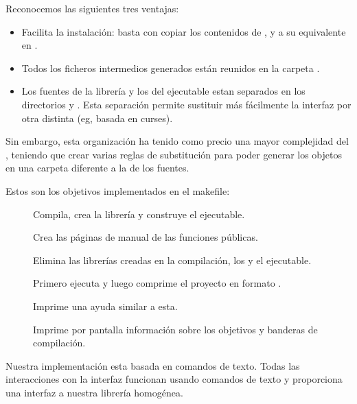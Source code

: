\documentclass[12pt, a4paper]{memoriaeps}
\begin{document}
Reconocemos las siguientes tres ventajas:
\begin{itemize}
	\item Facilita la instalación: basta con copiar los contenidos de ,  y  a su equivalente en .
	\item Todos los ficheros intermedios generados están reunidos en la carpeta .
	\item Los fuentes de la librería y los del ejecutable estan separados en los directorios  y . Esta separación permite sustituir más fácilmente la interfaz por otra distinta (eg, basada en curses).
\end{itemize}

Sin embargo, esta organización ha tenido como precio una mayor complejidad del , teniendo que crear varias reglas de substitución para poder generar los objetos en una carpeta diferente a la de los fuentes.

Estos son los objetivos implementados en el makefile:
\begin{description}
	\item[]   Compila, crea la librería y construye el ejecutable.
	\item[]  Crea las páginas de manual de las funciones públicas.
	\item[] Elimina las librerías creadas en la compilación, los  y el ejecutable.
	\item[]  Primero ejecuta  y luego comprime el proyecto en formato .
	\item[]  Imprime una ayuda similar a esta.
	\item[]  Imprime por pantalla información sobre los objetivos y banderas de compilación.
\end{description}



Nuestra implementación esta basada en comandos de texto. Todas las interacciones con la interfaz funcionan usando comandos de texto y proporciona una interfaz a nuestra librería homogénea.
\end{document}
